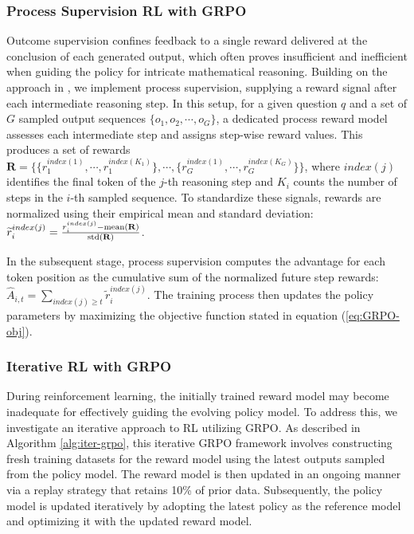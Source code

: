 \begin{itemize}[topsep=0pt]
\subsubsection{Process Supervision RL with GRPO}

Outcome supervision confines feedback to a single reward delivered at the conclusion of each generated output, which often proves insufficient and inefficient when guiding the policy for intricate mathematical reasoning. Building on the approach in \cite{wang2023math}, we implement process supervision, supplying a reward signal after each intermediate reasoning step. In this setup, for a given question $q$ and a set of $G$ sampled output sequences $\{o_1, o_2, \cdots, o_G\}$, a dedicated process reward model assesses each intermediate step and assigns step-wise reward values. This produces a set of rewards $\mathbf{R} = \{ \{r_1^{index(1)},\cdots,r_1^{index(K_1)}\}, \cdots,  \{r_G^{index(1)},\cdots,r_G^{index(K_G)}\} \}$, where $index(j)$ identifies the final token of the $j$-th reasoning step and $K_i$ counts the number of steps in the $i$-th sampled sequence. To standardize these signals, rewards are normalized using their empirical mean and standard deviation: $\widetilde{r}_i^{index(j)} = \frac{r_i^{index(j)} - {\rm mean(\mathbf{R})}}{{\rm std(\mathbf{R})}}$.

In the subsequent stage, process supervision computes the advantage for each token position as the cumulative sum of the normalized future step rewards: $\hat{A}_{i, t} = \sum_{index(j) \ge t} \widetilde{r}_i^{index(j)}$. The training process then updates the policy parameters by maximizing the objective function stated in equation (\ref{eq:GRPO-obj}).

\subsubsection{Iterative RL with GRPO} During reinforcement learning, the initially trained reward model may become inadequate for effectively guiding the evolving policy model. To address this, we investigate an iterative approach to RL utilizing GRPO. As described in Algorithm \ref{alg:iter-grpo}, this iterative GRPO framework involves constructing fresh training datasets for the reward model using the latest outputs sampled from the policy model. The reward model is then updated in an ongoing manner via a replay strategy that retains 10\% of prior data. Subsequently, the policy model is updated iteratively by adopting the latest policy as the reference model and optimizing it with the updated reward model.


\end{itemize}
